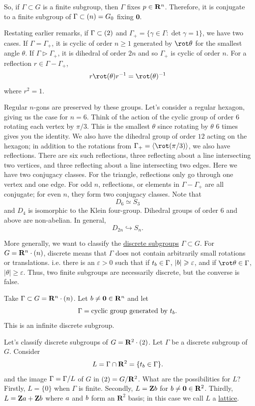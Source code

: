 \documentclass[11pt, oneside]{amsart}
\numberwithin{equation}{section}
\numberwithin{theorem}{section}
\theoremstyle{definition}
\let\O\relax
\let\bar\relax
\let\bf\relax
\def\Z{\mathbf{Z}}
\def\R{\mathbf{R}}
\def\0{\mathbf{0}}
\begin{document}
So, if $\Gamma \subset G$ is a finite subgroup, then $\Gamma$ fixes $\bf p \in \R^n$. Therefore, it is conjugate to a finite subgroup of $\Gamma \subset \O(n)=G_0$ fixing $\0$. 
{
Restating earlier remarks, if $\Gamma\subset \O(2)$ and $\Gamma_+ = \{ \gamma\in\Gamma : \det \gamma = 1 \}$, we have two cases. If $\Gamma=\Gamma_+$, it is cyclic of order $n\geqslant 1$ generated by $\rot \theta$ for the smallest angle $\theta$. If $\Gamma \rhd \Gamma_+$, it is dihedral of order $2n$ and so $\Gamma_+$ is cyclic of order $n$. For a reflection $r\in \Gamma - \Gamma_+$, 
$$
r\rot(\theta)r^{-1} = \rot(\theta)^{-1}
$$
where $r^2 = 1$. 

Regular $n$-gons are preserved by these groups. Let's consider a regular hexagon, giving us the case for $n=6$. Think of the action of the cyclic group of order $6$ rotating each vertex by $\pi/3$. This is the smallest $\theta$ since rotating by $\theta$ $6$ times gives you the identity. We also have the dihedral group of order $12$ acting on the hexagon; in addition to the rotations from $\Gamma_+ = \langle \rot (\pi/3)\rangle$, we also have reflections. There are six such reflections, three reflecting about a line intersecting two vertices, and three reflecting about a line intersecting two edges. Here we have two conjugacy classes. For the triangle, reflections only go through one vertex and one edge. For odd $n$, reflections, or elements in $\Gamma-\Gamma_+$ are all conjugate; for even $n$, they form two conjugacy classes. Note that
$$
D_6 \simeq S_3
$$
and $D_4$ is isomorphic to the Klein four-group. Dihedral groups of order $6$ and above are non-abelian. In general, 
$$
D_{2n} \hookrightarrow S_n.
$$

More generally, we want to classify the \underline{discrete subgroups} $\Gamma\subset G$. For $G=\R^n\cdot\O(n)$, discrete means that $\Gamma$ does not contain arbitrarily small rotations or translations. i.e. there is an $\varepsilon > 0$ such that if $t_\bf b \in \Gamma$, $|\bf b| \geqslant \varepsilon$, and if $\rot \theta \in \Gamma$, $|\theta| \geqslant \varepsilon$. Thus, two finite subgroups are necessarily discrete, but the converse is false. 

Take $\Gamma \subset G = \R^n \cdot \O(n)$. Let $\bf b \neq \0\in\R^n$ and let 
$$
\Gamma = \textrm{cyclic group generated by } t_\bf b.
$$
This is an infinite discrete subgroup.

Let's classify discrete subgroups of $G= \R^2\cdot \O(2)$. Let $\Gamma$ be a discrete subgroup of $G$. Consider 
$$
L = \Gamma \cap \R^2 = \{t_\bf b \in\Gamma\}.
$$
and the image $\bar{\Gamma} = \Gamma/L$ of $G$ in $\O(2) = G/\R^2$. What are the possibilities for $L$? Firstly, $L = \{0\}$ when $\Gamma$ is finite. Secondly, $L = \Z\bf b$ for $\bf b \neq \0 \in \R^2$. Thirdly, $L = \Z\bf a + \Z\bf b$ where $\bf a $ and $\bf b$ form an $\R^2$ basis; in this case we call $L$ a \underline{lattice}.

}
\end{document}
